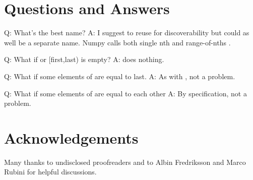 \section{Questions and Answers}

Q: What's the best name? A: I suggest to reuse  for discoverability but could as well be a separate name. Numpy calls both single nth and range-of-nths .

Q: What if  or [first,last) is empty? A:  does nothing.

Q: What if some elements of  are equal to last. A: As with , not a problem.

Q: What if some elements of  are equal to each other A: By specification, not a problem.

\section*{Acknowledgements}

Many thanks to undisclosed proofreaders and to 
Albin Fredriksson and Marco Rubini for helpful discussions.


\renewcommand{\bibname}{References}



